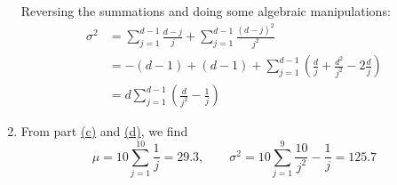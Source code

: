 \begin{solution}
\begin{enumerate}[label=(\alph*)]
\[        \]
        Reversing the summations and doing some algebraic manipulations:
        \begin{align*}
           \sigma^2 &= \sum_{j=1}^{d-1} \frac{d-j}{j} + \sum_{j=1}^{d-1} \frac{(d-j)^2}{j^2} \\
            &= -(d-1) + (d-1) + \sum_{j=1}^{d-1} \left(\frac{d}{j} + \frac{d^2}{j^2} -2 \frac{d}{j}\right) \\
            &= d\sum_{j=1}^{d-1} \left(\frac{d}{j^2} - \frac{1}{j}\right)
        \end{align*}
        \item From part \hyperlink{eq:ch4:2:c}{(c)} and \hyperlink{eq:ch4:2:d}{(d)}, we find
        \[
            \mu = 10\sum_{j=1}^{10} \frac{1}{j} = 29.3, \qquad \sigma^2 = 10 \sum_{j=1}^{9} \frac{10}{j^2} - \frac{1}{j} = 125.7
        \]
    \end{enumerate}
\end{solution}

